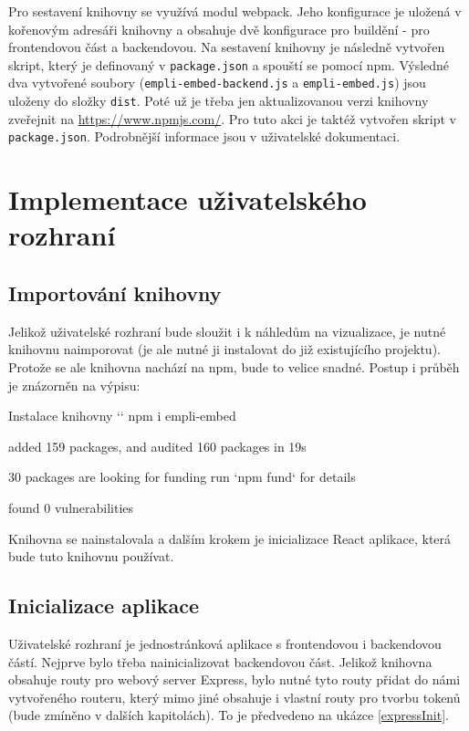 \documentclass[czech, bc, kiv, he, iso690numb]{fasthesis}
\begin{document}
Pro sestavení knihovny se využívá modul webpack. Jeho konfigurace je uložená v kořenovým adresáři knihovny a obsahuje dvě konfigurace pro buildění - pro frontendovou část a backendovou.
Na sestavení knihovny je následně vytvořen skript, který je definovaný v \texttt{package.json} a spouští se pomocí npm. Výsledné dva vytvořené soubory (\texttt{empli-embed-backend.js} a \texttt{empli-embed.js})
jsou uloženy do složky \texttt{dist}. Poté už je třeba jen aktualizovanou verzi knihovny zveřejnit na \url{https://www.npmjs.com/}. Pro tuto akci je taktéž vytvořen skript v \texttt{package.json}.
Podrobnější informace jsou v uživatelské dokumentaci.

\section{Implementace uživatelského rozhraní}

\subsection{Importování knihovny}

Jelikož uživatelské rozhraní bude sloužit i k náhledům na vizualizace, je nutné knihovnu naimporovat (je ale nutné ji instalovat do již existujícího projektu). Protože se ale knihovna nachází na npm, bude to velice snadné.
Postup i průběh je znázorněn na výpisu: 
\begin{console}{Instalace knihovny}
`\winprompt` npm i empli-embed

added 159 packages, and audited 160 packages in 19s

30 packages are looking for funding
  run `npm fund` for details

found 0 vulnerabilities
\end{console}

Knihovna se nainstalovala a dalším krokem je inicializace React aplikace, která bude tuto knihovnu používat.

\subsection{Inicializace aplikace}

Uživatelské rozhraní je jednostránková aplikace s frontendovou i backendovou částí. Nejprve bylo třeba nainicializovat backendovou část. Jelikož knihovna obsahuje routy pro webový
server Express, bylo nutné tyto routy přidat do námi vytvořeného routeru, který mimo jiné obsahuje i vlastní routy pro tvorbu tokenů (bude zmíněno v dalších kapitolách). To je předvedeno na
ukázce \ref{expressInit}.
\end{document}
